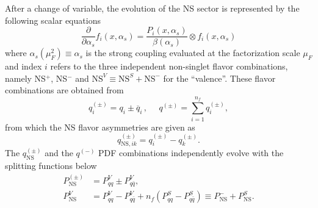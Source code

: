 \documentclass[preprint,12pt]{elsarticle}
\begin{document}
After a change of variable, the evolution of the NS sector is represented by the following scalar equations
%
\begin{equation}
\frac{\partial}{\partial\alpha_s}f_i(x,\alpha_s) = \frac{P_{i}(x,\alpha_{s})}{\beta(\alpha_s)} \otimes f_i(x,\alpha_s)
\label{NS-DGLAP}
\end{equation}
%
where $\alpha_s(\mu_F^2)\equiv\alpha_s$ is the strong coupling evaluated at the factorization scale $\mu_F$ and index $i$ refers to the three independent non-singlet flavor combinations, namely NS$^{+}$, NS$^{-}$ and $\textrm{NS}^{V}\equiv\textrm{NS}^{S}+\textrm{NS}^{-}$ for the ``valence''. These flavor combinations are obtained from
\begin{equation}
q_{i}^{(\pm)}=q_{i}\pm\overline{q}_{i}\,,
~~~~~~q^{(\pm)}=\sum_{i=1}^{n_{f}}q_{i}^{(\pm)},
\label{Flav-comb}
\end{equation}
%
from which the NS flavor asymmetries are given as
\begin{equation}
q_{\mathrm{NS},ik}^{(\pm)} = q_i^{(\pm)} -q_k^{(\pm)}.
\end{equation}
%
The $q_{\mathrm{NS}}^{(\pm)}$ and the $q^{(-)}$ PDF combinations independently evolve with the splitting functions below
\begin{align}
P_{\mathrm{NS}}^{(\pm)} &= P_{qq}^V \pm P_{q\bar{q}}^V, \\
P_{\mathrm{NS}}^V &= P_{qq}^V - P_{q\bar{q}}^V + n_f(P_{qq}^S - P_{q\bar{q}}^S) \equiv P_{\mathrm{NS}}^- + P_{\mathrm{NS}}^S.
\label{NS-splittings}
\end{align}
%
\end{document}
